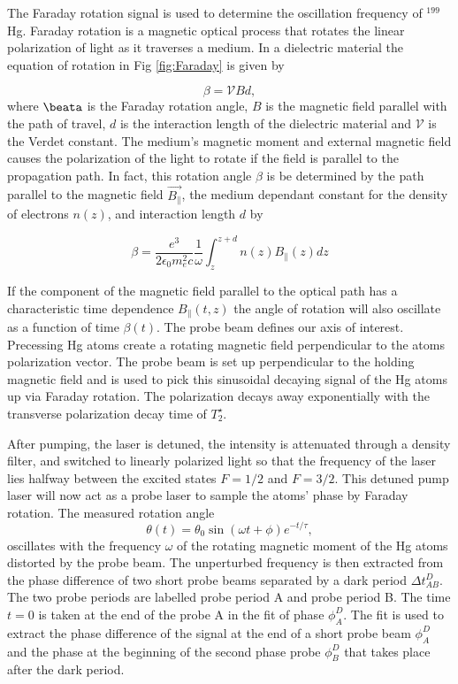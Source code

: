 The Faraday rotation signal is used to determine the oscillation frequency of $^{199}$Hg. Faraday rotation is a magnetic optical process that rotates the linear polarization of light as it traverses a medium. In a dielectric material the equation of rotation in Fig \ref{fig:Faraday} is given by

\begin{equation}
    \beta = \mathcal{V}Bd,
\end{equation}
where $\beata$ is the Faraday rotation angle,  $B$ is the magnetic field parallel with the path of travel, $d$ is the interaction length of the dielectric material and $\mathcal{V}$ is the Verdet constant. The medium's magnetic moment and external magnetic field causes the polarization of the light to rotate if the field is parallel to the propagation path. In fact, this rotation angle $\beta$ is be determined by the path parallel to the magnetic field $\vec{B_\parallel}$, the medium dependant constant for the density of electrons $n(z)$, and interaction length $d$ by

\begin{equation}
    \beta =  \frac{e^3}{2\epsilon_0m^2_ec}\frac{1}{\omega}\int_z^{z+d} n(z)B_\parallel (z)dz
\end{equation}

If the component of the magnetic field parallel to the optical path has a characteristic time dependence ${B_\parallel}(t,z)$ the angle of rotation will also oscillate as a function of time $\beta(t)$. The probe beam defines our axis of interest. Precessing Hg atoms create a rotating magnetic field perpendicular to the atoms polarization vector. The probe beam is set up perpendicular to the holding magnetic field and is used to pick this sinusoidal decaying signal of the Hg atoms up via Faraday rotation. The polarization decays away exponentially with the transverse polarization decay time of $T_2^\star$.

After pumping, the laser is detuned, the intensity is attenuated through a density filter, and switched to linearly polarized light so that the frequency of the laser lies halfway between the excited states  $F=1/2$ and $F=3/2$. This detuned pump laser will now act as a probe laser to sample the atoms' phase by Faraday rotation. The measured rotation angle
\begin{equation}
    \theta(t)=\theta_0 \sin{(\omega t + \phi)}e^{-t/\tau},
\end{equation}\label{eq:faraday} 
oscillates with the frequency $\omega$ of the rotating magnetic moment of the Hg atoms distorted by the probe beam. The unperturbed frequency is then extracted from the phase difference of two short probe beams separated by a dark period $\Delta t^D_{AB}$. The two probe periods are labelled probe period A and probe period B. The time $t=0$ is taken at the end of the probe A in the fit of phase $\phi^D_{A}$. The fit is used to extract the phase difference of the signal at the end of a short probe beam $\phi_A^D$ and the phase at the beginning of the second phase probe $\phi_B^D$ that takes place after the dark period.


